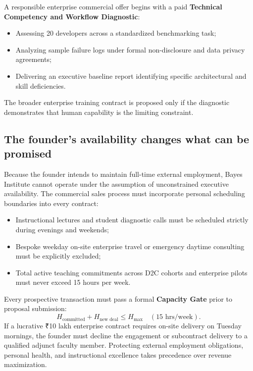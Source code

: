 A responsible enterprise commercial offer begins with a paid \textbf{Technical Competency and Workflow Diagnostic}:
\begin{itemize}
\item Assessing 20 developers across a standardized benchmarking task;
\item Analyzing sample failure logs under formal non-disclosure and data privacy agreements;
\item Delivering an executive baseline report identifying specific architectural and skill deficiencies.
\end{itemize}
The broader enterprise training contract is proposed only if the diagnostic demonstrates that human capability is the limiting constraint.

\subsection{The founder's availability changes what can be promised}

Because the founder intends to maintain full-time external employment, Bayes Institute cannot operate under the assumption of unconstrained executive availability. The commercial sales process must incorporate personal scheduling boundaries into every contract:
\begin{itemize}
\item Instructional lectures and student diagnostic calls must be scheduled strictly during evenings and weekends;
\item Bespoke weekday on-site enterprise travel or emergency daytime consulting must be explicitly excluded;
\item Total active teaching commitments across D2C cohorts and enterprise pilots must never exceed 15 hours per week.
\end{itemize}
Every prospective transaction must pass a formal \textbf{Capacity Gate} prior to proposal submission:
\begin{equation}
H_{\text{committed}} + H_{\text{new deal}} \le H_{\text{max}} \quad (15 \text{ hrs/week}).
\end{equation}
If a lucrative ₹10 lakh enterprise contract requires on-site delivery on Tuesday mornings, the founder must decline the engagement or subcontract delivery to a qualified adjunct faculty member. Protecting external employment obligations, personal health, and instructional excellence takes precedence over revenue maximization.

